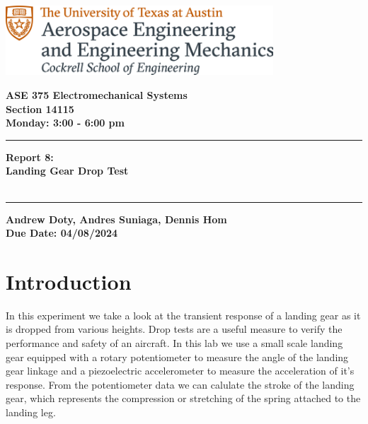 \documentclass{article}
\begin{document}
\begin{titlepage}
  \centering
  \includegraphics[width=10cm]{ase-logo-formal.png}  %
  \vspace{1cm}  %
 
  \Large \textbf{ASE 375 Electromechanical Systems}\\
  \large \textbf{Section 14115}\\
  \vspace{0.5cm}
  \textbf{Monday: 3:00 - 6:00 pm}\\
 
  \vspace{1cm}
 
  \hrule
  \vspace{0.5cm}
 
  \Huge \textbf{Report 8:\\
    Landing Gear Drop Test}\\
  \Huge \textbf{}\\
 
  \vspace{0.5cm}
  \hrule
 
  \vspace{1cm}
 
  \normalsize \textbf{Andrew Doty, Andres Suniaga, Dennis Hom}\\
  \normalsize \textbf{Due Date: 04/08/2024}
 
\end{titlepage}
\newpage

\tableofcontents
\thispagestyle{empty}
\newpage

\section{Introduction}
In this experiment we take a look at the transient response of a landing gear as it is dropped from various heights. Drop tests are a useful measure to verify the performance and safety of an aircraft. In this lab we use a small scale landing gear equipped with a rotary potentiometer to measure the angle of the landing gear linkage and a piezoelectric accelerometer to measure the acceleration of it's response. From the potentiometer data we can calulate the stroke of the landing gear, which represents the compression or stretching of the spring attached to the landing leg.
\vspace{2.5mm}
\end{document}
